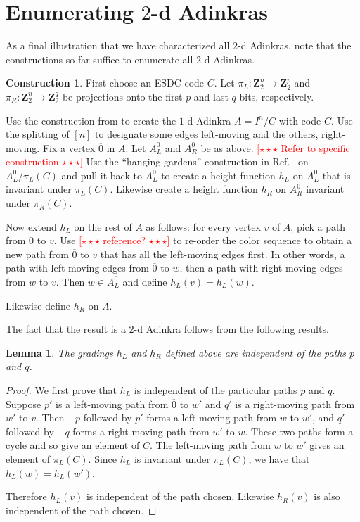 \documentclass[12pt,twoside,singlespace]{article}
\numberwithin{equation}{section}
\newtheorem{lem}[equation]{Lemma}
\theoremstyle{definition}
\newtheorem{construction}[equation]{Construction}
\newcommand{\ZZ}{\mathbf{Z}}
\newcommand{\com}[1]{\textcolor{red}{$[\star \star \star$ #1 $\star \star \star]$}}
\begin{document}
\section{Enumerating $2$-d Adinkras}
As a final illustration that we have characterized all $2$-d Adinkras, note that the constructions so far suffice to enumerate all $2$-d Adinkras.

\begin{construction}
First choose an ESDC code $C$.  Let $\pi_L:\ZZ_2^n\to\ZZ_2^p$ and $\pi_R:\ZZ_2^n\to\ZZ_2^q$ be projections onto the first $p$ and last $q$ bits, respectively.

Use the construction from \cite{rAT2} to create the $1$-d Adinkra $A=I^n/C$ with code $C$.  Use the splitting of $[n]$ to designate some edges left-moving and the others, right-moving.  Fix a vertex $\overline{0}$ in $A$.  Let $A_L^0$ and $A_R^0$ be as above. \com{Refer to specific construction}  Use the ``hanging gardens'' construction in Ref.~\cite{hgt} on $A_L^0/\pi_L(C)$ and pull it back to $A_L^0$ to create a height function $h_L$ on $A_L^0$ that is invariant under $\pi_L(C)$.  Likewise create a height function $h_R$ on $A_R^0$ invariant under $\pi_R(C)$.

Now extend $h_L$ on the rest of $A$ as follows: for every vertex $v$ of $A$, pick a path from $\overline{0}$ to $v$.  Use \com{reference?} to re-order the color sequence to obtain a new path from $\overline{0}$ to $v$ that has all the left-moving edges first.  In other words, a path with left-moving edges from $\overline{0}$ to $w$, then a path with right-moving edges from $w$ to $v$.  Then $w\in A_L^0$ and define $h_L(v)=h_L(w)$.

Likewise define $h_R$ on $A$.
\end{construction}

The fact that the result is a $2$-d Adinkra follows from the following results.

\begin{lem}
The gradings $h_L$ and $h_R$ defined above are independent of the paths $p$ and $q$.\label{lem:indep}
\end{lem}

\begin{proof}
We first prove that $h_L$ is independent of the particular paths $p$ and $q$.  Suppose $p'$ is a left-moving path from $\overline{0}$ to $w'$ and $q'$ is a right-moving path from $w'$ to $v$.  Then $-p$ followed by $p'$ forms a left-moving path from $w$ to $w'$, and $q'$ followed by $-q$ forms a right-moving path from $w'$ to $w$.  These two paths form a cycle and so give an element of $C$.  The left-moving path from $w$ to $w'$ gives an element of $\pi_L(C)$.  Since $h_L$ is invariant under $\pi_L(C)$, we have that $h_L(w)=h_L(w')$.

Therefore $h_L(v)$ is independent of the path chosen.  Likewise $h_R(v)$ is also independent of the path chosen.
\end{proof}
\end{document}
